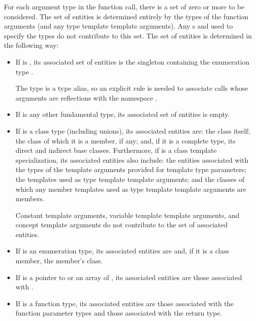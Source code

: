 \pnum
For each argument type  in the function call,
there is a set of zero or more 
to be considered.
The set of entities is determined entirely by
the types of the function arguments
(and any type template template arguments).
Any s and 
used to specify the types
do not contribute to this set.
The set of entities
is determined in the following way:
\begin{itemize}
\item If  is ,
its associated set of entities is the singleton containing
the enumeration type .
\begin{note}
The  type is a type alias,
so an explicit rule is needed to associate calls
whose arguments are reflections with the namespace .
\end{note}

\item If  is any other fundamental type, its associated set of
entities is empty.

\item If  is a class type (including unions),
its associated entities are:
the class itself;
the class of which it is a member, if any;
and, if it is a complete type, its direct and indirect base classes.
Furthermore, if  is a class template specialization,
its associated entities also include:
the entities
associated with the types of the template arguments
provided for template type parameters;
the templates used as type template template arguments; and
the classes of which any member templates used as type template template
arguments are members.
\begin{note}
Constant template arguments,
variable template template arguments, and
concept template arguments
do not
contribute to the set of associated entities.
\end{note}

\item If  is an enumeration type,
its associated entities are 
and, if it is a class member, the member's class.

\item If  is a pointer to  or an array of ,
its associated entities are those associated with .

\item If  is a function type, its associated
entities are those associated with the function parameter types and those
associated with the return type.


\end{itemize}
